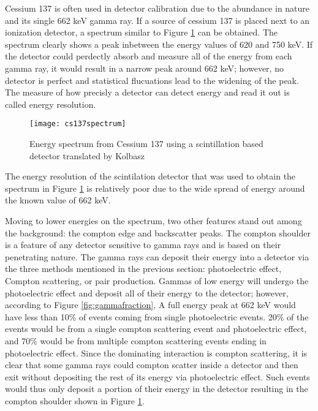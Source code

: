 Cessium 137 is often used in detector calibration due to the abundance in nature and its single 662 keV gamma ray.
If a source of cessium 137 is placed next to an ionization detector, a spectrum similar to Figure \ref{fig:cs137spectrum} can be obtained.
The spectrum clearly shows a peak inbetween the energy values of 620 and 750 keV.
If the detector could perdectly absorb and measure all of the energy from each gamma ray, it would result in a narrow peak around 662 keV; however, no detector is perfect and statistical flucuations lead to the widening of the peak.
The measure of how precisly a detector can detect energy and read it out is called energy resolution.
\begin{figure}[htpb]
\centering
\texttt{[image: cs137spectrum]}
\caption{Energy spectrum from Cessium 137 using a scintillation based detector \cite{CS137SPEC} translated by Kolbasz}
\label{fig:cs137spectrum}
\end{figure}
The energy resolution of the scintilation detector that was used to obtain the spectrum in Figure \ref{fig:cs137spectrum} is relatively poor due to the wide spread of energy around the known value of 662 keV.

Moving to lower energies on the spectrum, two other features stand out among the background: the compton edge and backscatter peaks.
The compton shoulder is a feature of any detector sensitive to gamma rays and is based on their penetrating nature.
The gamma rays can deposit their energy into a detector via the three methods mentioned in the previous section: photoelectric effect, Compton scattering, or pair production.
Gammas of low energy will undergo the photoelectric effect and deposit all of their energy to the detector; however, according to Figure \ref{fig:gammafraction}, A full energy peak at 662 keV would have less than 10\% of events coming from single photoelectric events.
20\% of the events would be from a single compton scattering event and photoelectric effect, and 70\% would be from multiple compton scattering events ending in photoelectric effect.
Since the dominating interaction is compton scattering, it is clear that some gamma rays could compton scatter inside a detector and then exit without depositing the rest of its energy via photoelectric effect.
Such events would thus only deposit a portion of their energy in the detector resulting in the compton shoulder shown in Figure \ref{fig:cs137spectrum}.

